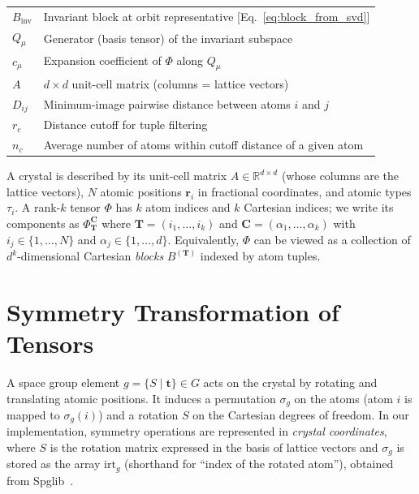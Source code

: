 \documentclass[twocolumn,amsmath,amssymb,aps,prb,10pt,floatfix]{revtex4-2}
\newcommand{\vT}{\mathbf{T}}
\newcommand{\vC}{\mathbf{C}}
\begin{document}
\begin{table}[ht]
\begin{ruledtabular}
\begin{tabular}{ll}
$B_{\mathrm{inv}}$ & Invariant block at orbit representative [Eq.~\eqref{eq:block_from_svd}] \\
$Q_\mu$          & Generator (basis tensor) of the invariant subspace \\
$c_\mu$          & Expansion coefficient of $\Phi$ along $Q_\mu$ \\
$A$              & $d \times d$ unit-cell matrix (columns = lattice vectors) \\
$D_{ij}$         & Minimum-image pairwise distance between atoms $i$ and $j$ \\
$r_c$            & Distance cutoff for tuple filtering \\
$n_c$            & Average number of atoms within cutoff distance of a given atom \\
\end{tabular}
\end{ruledtabular}
\end{table}

A crystal is described by its unit-cell matrix $A \in \mathbb{R}^{d \times d}$ (whose columns are the lattice vectors), $N$ atomic positions $\mathbf{r}_i$ in fractional coordinates, and atomic types $\tau_i$.
A rank-$k$ tensor $\Phi$ has $k$ atom indices and $k$ Cartesian indices; we write its components as $\Phi_{\vT}^{\vC}$ where $\vT = (i_1,\dots,i_k)$ and $\vC = (\alpha_1,\dots,\alpha_k)$ with $i_j \in \{1,\dots,N\}$ and $\alpha_j \in \{1,\dots,d\}$.
Equivalently, $\Phi$ can be viewed as a collection of $d^k$-dimensional Cartesian \emph{blocks} $B^{(\vT)}$ indexed by atom tuples.


\section{Symmetry Transformation of Tensors}
\label{sec:transformation}

A space group element $g = \{S \mid \mathbf{t}\} \in G$ acts on the crystal by rotating and translating atomic positions.
It induces a permutation $\sigma_g$ on the atoms (atom $i$ is mapped to $\sigma_g(i)$) and a rotation $S$ on the Cartesian degrees of freedom.
In our implementation, symmetry operations are represented in \emph{crystal coordinates}, where $S$ is the rotation matrix expressed in the basis of lattice vectors and $\sigma_g$ is stored as the array $\mathrm{irt}_g$ (shorthand for ``index of the rotated atom''), obtained from Spglib~\cite{Togo2024spglib}.
\end{document}
